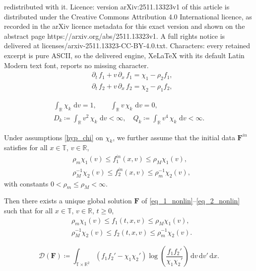 \documentclass[10pt,a4paper]{amsart}
\newcommand{\Fbf}{\mathbf{F}}
\newcommand{\R}{\mathbb{R}}
\newcommand{\T}{\mathbb{T}}
\newcommand{\dd}{\,\mathrm{d}}
\newcommand{\dt}{\,\partial_t\, }
\newcommand{\dx}{\,\partial_x\, }
\begin{document}
redistributed with it. Licence: version arXiv:2511.13323v1 of this article is distributed under the Creative Commons Attribution 4.0 International licence, as recorded in the arXiv licence metadata for this exact version and shown on the abstract page https://arxiv.org/abs/2511.13323v1. A full rights notice is delivered at licenses/arxiv-2511.13323-CC-BY-4.0.txt. Characters: every retained excerpt is pure ASCII, so the delivered engine, XeLaTeX with its default Latin Modern text font, reports no missing character.
\begin{align}
    &\dt f_1 + v\dx f_1 = \chi_1 - \rho_2 f_1, \label{eq_1_nonlin}\\
    &\dt f_2 + v\dx f_2 = \chi_2 - \rho_1 f_2, \label{eq_2_nonlin}
\end{align}

\begin{equation}\label{hyp_chi}
    \begin{gathered}
        \int_\R \chi_k\,\dd v=1,\qquad \int_\R v\,\chi_k\,\dd v=0,\\
        D_k\coloneq\int_\R v^2\,\chi_k\,\dd v<\infty,\quad Q_k\coloneq\int_\R v^4\,\chi_k\,\dd v<\infty.
    \end{gathered}
\end{equation}

\begin{Proposition}
    Under assumptions \eqref{hyp_chi} on $\chi_k$, we further assume that the initial data $\Fbf^{in}$ satisfies for all $x\in\T$, $v\in\R$, 
    \begin{align}
        &\rho_m\chi_1(v)\leq f_1^{in}(x,v)\leq \rho_M\chi_1(v), \label{hyp.CI.1}\\
        &\rho_M^{-1}\chi_2(v)\leq f_2^{in}(x,v)\leq \rho_m^{-1}\chi_2(v), \label{hyp.CI.2}
    \end{align}
    with constants $0<\rho_m\leq \rho_M<\infty$.
    
    Then there exists a unique global solution $\Fbf$ of \eqref{eq_1_nonlin}--\eqref{eq_2_nonlin} such that for all $x\in\T$, $v\in\R$, $t\geq 0$,
    \begin{align}
        &\rho_m\chi_1(v)\leq f_1(t,x,v)\leq \rho_M\chi_1(v), \label{estimLinf_f1}\\
        &\rho_M^{-1}\chi_2(v)\leq f_2(t,x,v)\leq \rho_m^{-1}\chi_2(v). \label{estimLinf_f2}
    \end{align}
\end{Proposition}

\begin{equation}\label{def.D}
    \mathcal{D}(\Fbf)\coloneq \int_{\T\times\R^2}(f_1f_2'-\chi_1\chi_2')\log\left( \frac{f_1f_2'}{\chi_1\chi_2'} \right)\dd v \dd v' \dd x.
\end{equation}
\end{document}
